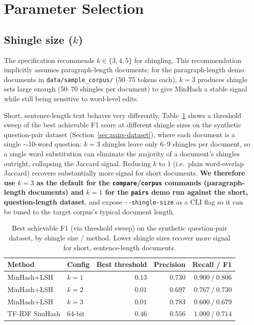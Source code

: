 \documentclass[11pt]{article}
\begin{document}
\section{Parameter Selection}
\label{sec:params}

\subsection{Shingle size ($k$)}
\label{sec:shingle-size-short}

The specification recommends $k \in \{3, 4, 5\}$ for shingling. This recommendation implicitly assumes
paragraph-length documents; for the paragraph-length demo documents in \verb|data/sample_corpus/|
(50--75 tokens each), $k=3$ produces shingle sets large enough (50--70 shingles per document) to give
MinHash a stable signal while still being sensitive to word-level edits.

Short, sentence-length text behaves very differently. Table~\ref{tab:threshold-sweep} shows a threshold
sweep of the best achievable F1 score at different shingle sizes on the synthetic question-pair dataset
(Section~\ref{sec:pairs-dataset}), where each document is a single $\sim$10-word question: $k=3$ shingles
leave only 6--9 shingles per document, so a single word substitution can eliminate the majority of a
document's shingles outright, collapsing the Jaccard signal. Reducing $k$ to $1$ (i.e.\ plain word-overlap
Jaccard) recovers substantially more signal for short documents. \textbf{We therefore use $k=3$ as the
default for the \texttt{compare}/\texttt{corpus} commands (paragraph-length documents) and $k=1$ for the
\texttt{pairs} demo run against the short, question-length dataset}, and expose \verb|--shingle-size| as a
CLI flag so it can be tuned to the target corpus's typical document length.

\begin{table}[H]
    \centering
    \caption{Best achievable F1 (via threshold sweep) on the synthetic question-pair dataset, by shingle
    size / method. Lower shingle sizes recover more signal for short, sentence-length documents.}
    \label{tab:threshold-sweep}
    \begin{tabular}{@{}llrrr@{}}
        \toprule
        Method & Config & Best threshold & Precision & Recall / F1 \\
        \midrule
        MinHash+LSH & $k=1$ & $0.13$ & $0.730$ & $0.900\ /\ 0.806$ \\
        MinHash+LSH & $k=2$ & $0.01$ & $0.697$ & $0.767\ /\ 0.730$ \\
        MinHash+LSH & $k=3$ & $0.01$ & $0.783$ & $0.600\ /\ 0.679$ \\
        TF-IDF SimHash & 64-bit & $0.46$ & $0.556$ & $1.000\ /\ 0.714$ \\
        \bottomrule
    \end{tabular}
\end{table}
\end{document}
